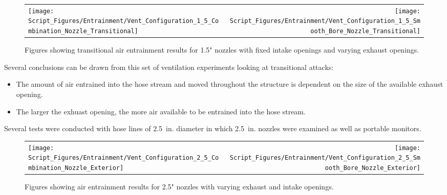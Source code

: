 \documentclass[12pt,oneside]{book}
\begin{document}
\begin{figure}[!ht]
\begin{tabular*}{\textwidth}{lr}
\texttt{[image: Script\_Figures/Entrainment/Vent\_Configuration\_1\_5\_Combination\_Nozzle\_Transitional]} &
\texttt{[image: Script\_Figures/Entrainment/Vent\_Configuration\_1\_5\_Smooth\_Bore\_Nozzle\_Transitional]} \\
\end{tabular*}
\caption{Figures showing transitional air entrainment results for 1.5" nozzles with fixed intake openings and varying exhaust openings.}
\label{fig:1_5_Transitional_Vents}
\end{figure}

Several conclusions can be drawn from this set of ventilation experiments looking at transitional attacks:

\begin{itemize}
	\item The amount of air entrained into the hose stream and moved throughout the structure is dependent on the size of the available exhaust opening.
	\item The larger the exhuast opening, the more air available to be entrained into the hose stream.
\end{itemize}

\clearpage

Several tests were conducted with hose lines of 2.5~in. diameter in which 2.5~in. nozzles were examined as well as portable monitors.

\begin{figure}[!ht]
\begin{tabular*}{\textwidth}{lr}
\texttt{[image: Script\_Figures/Entrainment/Vent\_Configuration\_2\_5\_Combination\_Nozzle\_Exterior]} &
\texttt{[image: Script\_Figures/Entrainment/Vent\_Configuration\_2\_5\_Smooth\_Bore\_Nozzle\_Exterior]} \\
\end{tabular*}
\caption{Figures showing air entrainment results for 2.5" nozzles with varying exhaust and intake openings.}
\label{fig:2_5_Exterior_Vents}
\end{figure}

\clearpage

\end{document}
